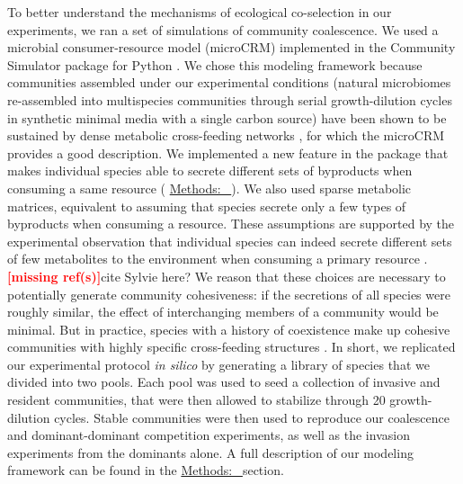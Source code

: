 \documentclass[a4paper,10pt]{article}
\newcommand{\mr}{\textcolor{red}{\textbf{[missing ref(s)]}}}
\newcommand{\methodsref}[1]{%
  \hyperref[{methods:#1}]{%
   Methods:~\nameref*{methods:#1}%
  }%
}
\begin{document}
To better understand the mechanisms of ecological co-selection in our experiments,
we ran a set of simulations of community coalescence. We used a microbial consumer-resource
model (microCRM) \cite{Goldford2018,Marsland2019} implemented in the Community Simulator package
for Python \cite{Marsland2020}. We chose this modeling framework because
communities assembled under our experimental conditions (natural microbiomes re-assembled into
multispecies communities through serial growth-dilution cycles in synthetic minimal media
with a single carbon source)
have been shown to be
sustained by dense metabolic cross-feeding networks \cite{Goldford2018}, for which the
microCRM provides a good description.
We implemented a new feature in the package that makes individual species
able to secrete different sets of byproducts when consuming a same resource
(\methodsref{sim}).
We also used sparse metabolic matrices, equivalent to assuming that species secrete only a few
types of byproducts when consuming a resource. These assumptions are supported by the experimental
observation that individual species can indeed secrete different sets of few metabolites
to the environment when consuming a primary resource
\cite{Harcombe2014,Pinu2018}. \mr cite Sylvie here?
We reason that these choices are necessary to potentially generate community cohesiveness:
if the secretions of all species were roughly similar, the effect of interchanging members of
a community would be minimal. But in practice, species with a history of coexistence make up
cohesive communities with highly specific cross-feeding structures \cite{Goldford2018,Estrela2020}.
In short,
we replicated our experimental protocol \textit{in silico}
by generating a library of species that we divided into two pools. Each pool was used to seed a
collection of invasive and resident communities, that were then allowed to stabilize through 20
growth-dilution cycles. Stable communities were then used to reproduce our coalescence
and dominant-dominant competition experiments,
as well as the invasion experiments from the dominants alone.
A full description of our modeling framework can be found in the \methodsref{sim} section.
\end{document}
